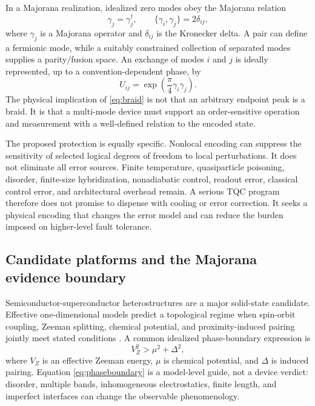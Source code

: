 \documentclass[conference]{IEEEtran}
\begin{document}
In a Majorana realization, idealized zero modes obey the Majorana relation
\begin{equation}
\gamma_j=\gamma_j^\dagger,\qquad \{\gamma_i,\gamma_j\}=2\delta_{ij},
\label{eq:majorana}
\end{equation}
where $\gamma_j$ is a Majorana operator and $\delta_{ij}$ is the Kronecker delta. A pair can define a fermionic mode, while a suitably constrained collection of separated modes supplies a parity/fusion space. An exchange of modes $i$ and $j$ is ideally represented, up to a convention-dependent phase, by
\begin{equation}
U_{ij}=\exp\left(\frac{\pi}{4}\gamma_i\gamma_j\right).
\label{eq:braid}
\end{equation}
The physical implication of \eqref{eq:braid} is not that an arbitrary endpoint peak is a braid. It is that a multi-mode device must support an order-sensitive operation and measurement with a well-defined relation to the encoded state.

The proposed protection is equally specific. Nonlocal encoding can suppress the sensitivity of selected logical degrees of freedom to local perturbations. It does not eliminate all error sources. Finite temperature, quasiparticle poisoning, disorder, finite-size hybridization, nonadiabatic control, readout error, classical control error, and architectural overhead remain. A serious TQC program therefore does not promise to dispense with cooling or error correction. It seeks a physical encoding that changes the error model and can reduce the burden imposed on higher-level fault tolerance.

\subsection{Candidate platforms and the Majorana evidence boundary}

Semiconductor-superconductor heterostructures are a major solid-state candidate. Effective one-dimensional models predict a topological regime when spin-orbit coupling, Zeeman splitting, chemical potential, and proximity-induced pairing jointly meet stated conditions \cite{lutchyn2010,oreg2010}. A common idealized phase-boundary expression is
\begin{equation}
V_Z^2>\mu^2+\Delta^2,
\label{eq:phaseboundary}
\end{equation}
where $V_Z$ is an effective Zeeman energy, $\mu$ is chemical potential, and $\Delta$ is induced pairing. Equation \eqref{eq:phaseboundary} is a model-level guide, not a device verdict: disorder, multiple bands, inhomogeneous electrostatics, finite length, and imperfect interfaces can change the observable phenomenology.
\end{document}
